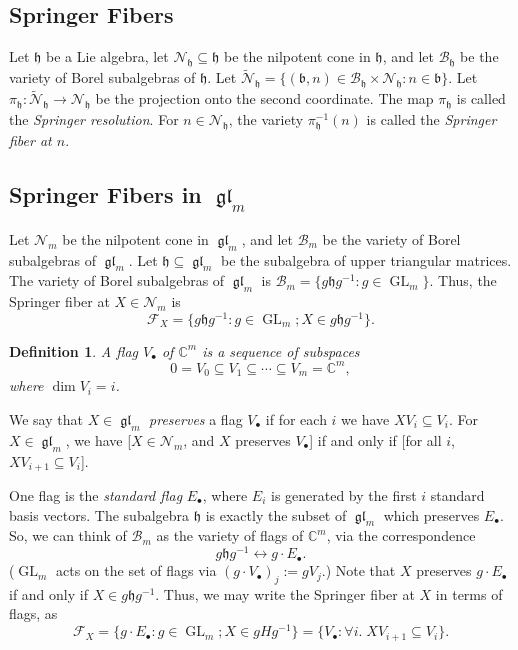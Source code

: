 \documentclass[12pt,psamsfonts]{article}
\DeclareMathOperator{\GL}{GL}
\DeclareMathOperator{\gl}{\mathfrak{gl}}
\newtheorem{definition}[theorem]{Definition}
\begin{document}
\subsection{Springer Fibers}
Let \(\mathfrak{h}\) be a Lie algebra, let \(\mathcal{N}_\mathfrak{h} \subseteq \mathfrak{h}\) be the nilpotent cone in \(\mathfrak{h}\), and let \(\mathcal{B}_\mathfrak{h}\) be the variety of Borel subalgebras of \(\mathfrak{h}\).
Let \(\widetilde{\mathcal{N}}_\mathfrak{h} = \{(\mathfrak{b}, n) \in \mathcal{B}_\mathfrak{h} \times \mathcal{N}_\mathfrak{h} : n \in \mathfrak{b}\}\).
Let \(\pi_\mathfrak{h} : \widetilde{\mathcal{N}}_\mathfrak{h} \to \mathcal{N}_\mathfrak{h}\) be the projection onto the second coordinate.
The map \(\pi_\mathfrak{h}\) is called the \emph{Springer resolution}.
For \(n \in \mathcal{N}_\mathfrak{h}\), the variety \(\pi_\mathfrak{h}^{-1}(n)\) is called the \emph{Springer fiber at \(n\)}.

\subsection{Springer Fibers in \texorpdfstring{\(\gl_m\)}{gl\_m}}
Let \(\mathcal{N}_m\) be the nilpotent cone in \(\gl_m\), and let \(\mathcal{B}_m\) be the variety of Borel subalgebras of \(\gl_m\).
Let \(\mathfrak{h} \subseteq \gl_m\) be the subalgebra of upper triangular matrices.
The variety of Borel subalgebras of \(\gl_m\) is \(\mathcal{B}_m = \{g\mathfrak{h}g^{-1} : g \in \GL_m\}\).
Thus, the Springer fiber at \(X \in \mathcal{N}_m\) is 
\[\mathcal{F}_X = \{g\mathfrak{h}g^{-1} : g \in \GL_m; X \in g\mathfrak{h}g^{-1}\}.\]
\begin{definition}
    A \emph{flag} \(V_\bullet\) of \(\mathbb{C}^m\) is a sequence of subspaces
    \[0 = V_0 \subseteq V_1 \subseteq \cdots \subseteq V_m = \mathbb{C}^m,\]
    where \(\dim V_i = i\).
\end{definition}
We say that \(X \in \gl_m\) \emph{preserves} a flag \(V_\bullet\) if for each \(i\) we have \(XV_i \subseteq V_i\).
For \(X \in \gl_m\), we have [\(X \in \mathcal{N}_m\), and \(X\) preserves \(V_\bullet\)] if and only if [for all \(i\), \(XV_{i + 1} \subseteq V_i\)].
\par One flag is the \emph{standard flag} \(E_\bullet\), where \(E_i\) is generated by the first \(i\) standard basis vectors.
The subalgebra \(\mathfrak{h}\) is exactly the subset of \(\gl_m\) which preserves \(E_\bullet\).
So, we can think of \(\mathcal{B}_m\) as the variety of flags of \(\mathbb{C}^m\), via the correspondence 
\[g\mathfrak{h}g^{-1} \leftrightarrow g \cdot E_\bullet.\]
(\(\GL_m\) acts on the set of flags via \((g \cdot V_\bullet)_j := gV_j\).)
Note that \(X\) preserves \(g \cdot E_\bullet\) if and only if \(X \in g \mathfrak{h} g^{-1}\).
Thus, we may write the Springer fiber at \(X\) in terms of flags, as 
\[\mathcal{F}_X = \{g \cdot E_\bullet : g \in \GL_m; X \in gHg^{-1}\} = \{V_\bullet : \forall i. \; XV_{i + 1} \subseteq V_i\}.\]
\end{document}
